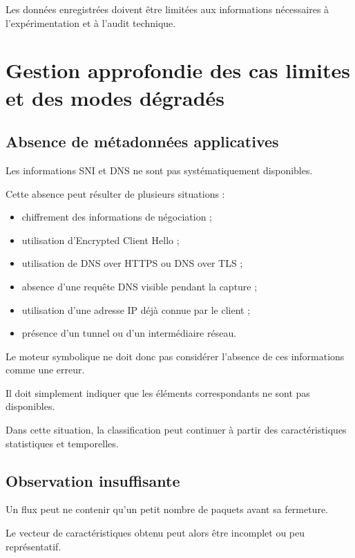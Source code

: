 Les données enregistrées doivent être limitées aux informations nécessaires à l'expérimentation et à l'audit technique.

\section{Gestion approfondie des cas limites et des modes dégradés}

\subsection{Absence de métadonnées applicatives}

Les informations SNI et DNS ne sont pas systématiquement disponibles.

Cette absence peut résulter de plusieurs situations :

\begin{itemize}
    \item chiffrement des informations de négociation ;
    \item utilisation d'Encrypted Client Hello ;
    \item utilisation de DNS over HTTPS ou DNS over TLS ;
    \item absence d'une requête DNS visible pendant la capture ;
    \item utilisation d'une adresse IP déjà connue par le client ;
    \item présence d'un tunnel ou d'un intermédiaire réseau.
\end{itemize}

Le moteur symbolique ne doit donc pas considérer l'absence de ces informations comme une erreur.

Il doit simplement indiquer que les éléments correspondants ne sont pas disponibles.

Dans cette situation, la classification peut continuer à partir des caractéristiques statistiques et temporelles.

\subsection{Observation insuffisante}

Un flux peut ne contenir qu'un petit nombre de paquets avant sa fermeture.

Le vecteur de caractéristiques obtenu peut alors être incomplet ou peu représentatif.

